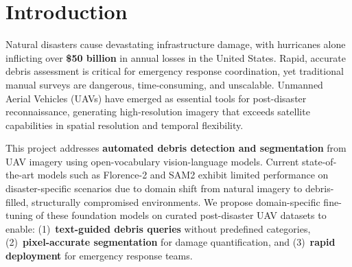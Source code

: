 \documentclass[10pt,a4paper,twocolumn]{article}
\begin{document}

\section{Introduction}

Natural disasters cause devastating infrastructure damage, with hurricanes alone
inflicting over \textbf{\$50 billion} in annual losses in the United States.
Rapid, accurate debris assessment is critical for emergency response coordination,
yet traditional manual surveys are dangerous, time-consuming, and unscalable.
Unmanned Aerial Vehicles (UAVs) have emerged as essential tools for post-disaster
reconnaissance, generating high-resolution imagery that exceeds satellite capabilities
in spatial resolution and temporal flexibility.

This project addresses \textbf{automated debris detection and segmentation} from UAV
imagery using open-vocabulary vision-language models. Current state-of-the-art
models such as Florence-2 and SAM2 exhibit limited performance on disaster-specific
scenarios due to domain shift from natural imagery to debris-filled, structurally
compromised environments. We propose domain-specific fine-tuning of these foundation
models on curated post-disaster UAV datasets to enable: (1)~\textbf{text-guided
debris queries} without predefined categories, (2)~\textbf{pixel-accurate
segmentation} for damage quantification, and (3)~\textbf{rapid deployment} for
emergency response teams.
\end{document}
